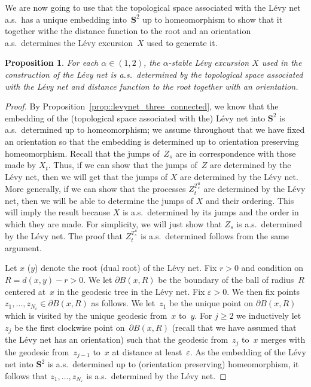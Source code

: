 \documentclass[JEP,XML,SOM,Unicode]{cedram}
\let\epsilon\varepsilon
\theoremstyle{plain}
\numberwithin{theorem}{section}
\newtheorem{proposition}[theorem]{Proposition}
\theoremstyle{definition}
\renewcommand{\S}{{\mathbf S}}
\begin{document}
We are now going to use that the topological space associated with the Lévy net a.s.\ has a unique embedding into~$\S^2$ up to homeomorphism to show that it together withe the distance function to the root and an orientation a.s.\ determines the Lévy excursion~$X$ used to generate it.

\begin{proposition}
\label{prop::levynet_structure_determined}
For each $\alpha \in (1,2)$, the $\alpha$-stable Lévy excursion $X$ used in the construction of the Lévy net is a.s.\ determined by the topological space associated with the Lévy net and distance function to the root together with an orientation.
\end{proposition}
\begin{proof}
By Proposition~\ref{prop::levynet_three_connected}, we know that the embedding of the (topological space associated with the) Lévy net into $\S^2$ is a.s.\ determined up to homeomorphism; we assume throughout that we have fixed an orientation so that the embedding is determined up to orientation preserving homeomorphism. Recall that the jumps of~$Z_s$ are in correspondence with those made by $X_t$. Thus, if we can show that the jumps of~$Z$ are determined by the Lévy net, then we will get that the jumps of $X$ are determined by the Lévy net. More generally, if we can show that the processes $Z_t^{T_s^u}$ are determined by the Lévy net, then we will be able to determine the jumps of $X$ and their ordering. This will imply the result because $X$ is a.s.\ determined by its jumps and the order in which they are made. For simplicity, we will just show that $Z_s$ is a.s.\ determined by the Lévy net. The proof that $Z_t^{T_s^u}$ is a.s.\ determined follows from the same argument.

Let $x$ (\resp $y$) denote the root (\resp dual root) of the Lévy net. Fix $r > 0$ and condition on $R = d(x,y) -r > 0$. We let $\partial B(x,R)$ be the boundary of the ball of radius~$R$ centered at~$x$ in the geodesic tree in the Lévy net. Fix $\epsilon > 0$. We then fix points $z_1,\ldots,z_{N_\epsilon} \in \partial B(x,R)$ as follows. We let~$z_1$ be the unique point on $\partial B(x,R)$ which is visited by the unique geodesic from~$x$ to~$y$. For $j \geq 2$ we inductively let~$z_j$ be the first clockwise point on~$\partial B(x,R)$ (recall that we have assumed that the Lévy net has an orientation) such that the geodesic from~$z_j$ to~$x$ merges with the geodesic from~$z_{j-1}$ to~$x$ at distance at least~$\epsilon$. As the embedding of the Lévy net into $\S^2$ is a.s.\ determined up to (orientation preserving) homeomorphism, it follows that $z_1,\ldots,z_{N_\epsilon}$ is a.s.\ determined by the Lévy net.


\end{proof}
\end{document}
